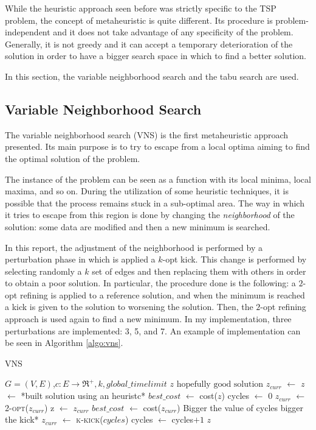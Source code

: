 While the heuristic approach seen before was strictly specific to the TSP problem, the concept of metaheuristic is quite different. Its procedure is problem-independent and it does not take advantage of any specificity of the problem. Generally, it is not greedy and it can accept a temporary deterioration of the solution in order to have a bigger search space in which to find a better solution.

In this section, the variable neighborhood search and the tabu search are used.

\subsection{Variable Neighborhood Search}
\label{sec:VNS}
The variable neighborhood search (VNS) is the first metaheuristic approach presented. Its main purpose is to try to escape from a local optima aiming to find the optimal solution of the problem. 

The instance of the problem can be seen as a function with its local minima, local maxima, and so on. During the utilization of some heuristic techniques, it is possible that the process remains stuck in a sub-optimal area. The way in which it tries to escape from this region is done by changing the \textit{neighborhood} of the solution: some data are modified and then a new minimum is searched.

In this report, the adjustment of the neighborhood is performed by a perturbation phase in which is applied a $k$-opt kick. This change is performed by selecting randomly a $k$ set of edges and then replacing them with others in order to obtain a poor solution. In particular, the procedure done is the following: a $2$-opt refining is applied to a reference solution, and when the minimum is reached a kick is given to the solution to worsening the solution. Then, the $2$-opt refining approach is used again to find a new minimum. In my implementation, three perturbations are implemented: 3, 5, and 7. An example of implementation can be seen in Algorithm \ref{algo:vns}.

\begin{algorithm}
	\caption{VNS}\label{algo:vns}
	\begin{algorithmic}[1]
		\Require $G=(V,E)$,$ c:E\rightarrow \Re^+, k, global\_timelimit$
		\Ensure $z\text{ hopefully good solution}$
		\State $z_{curr}$ $\gets$ $z$ $\gets$ *built solution using an heuristc*
		\State $best\_cost$ $\gets$ cost($z$)
		\State cycles $\gets$ $0$
			\State $z_{curr}$ $\gets$ \textsc{2-opt($z_{curr}$)}
				\State z $\gets$ $z_{curr}$
				\State $best\_cost$ $\gets$ cost($z_{curr}$)
			\EndIf
		\State *Bigger the value of cycles bigger the kick*
		\State $z_{curr}$ $\gets$ \textsc{k-kick($cycles$)}
		\State cycles $\gets$ cycles$+1$
		\EndWhile
		\State \Return $z$
	\end{algorithmic}
\end{algorithm}


